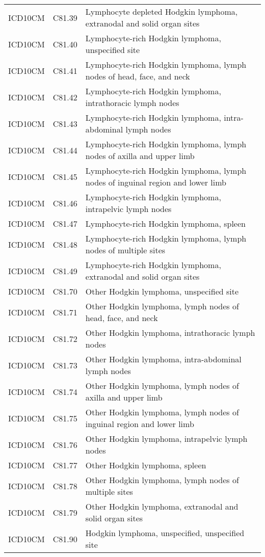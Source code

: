 \begin{longtable}{p{}p{}p{}}
  ICD10CM & C81.39 & Lymphocyte depleted Hodgkin lymphoma, extranodal and solid organ sites \\ 
  ICD10CM & C81.40 & Lymphocyte-rich Hodgkin lymphoma, unspecified site \\ 
  ICD10CM & C81.41 & Lymphocyte-rich Hodgkin lymphoma, lymph nodes of head, face, and neck \\ 
  ICD10CM & C81.42 & Lymphocyte-rich Hodgkin lymphoma, intrathoracic lymph nodes \\ 
  ICD10CM & C81.43 & Lymphocyte-rich Hodgkin lymphoma, intra-abdominal lymph nodes \\ 
  ICD10CM & C81.44 & Lymphocyte-rich Hodgkin lymphoma, lymph nodes of axilla and upper limb \\ 
  ICD10CM & C81.45 & Lymphocyte-rich Hodgkin lymphoma, lymph nodes of inguinal region and lower limb \\ 
  ICD10CM & C81.46 & Lymphocyte-rich Hodgkin lymphoma, intrapelvic lymph nodes \\ 
  ICD10CM & C81.47 & Lymphocyte-rich Hodgkin lymphoma, spleen \\ 
  ICD10CM & C81.48 & Lymphocyte-rich Hodgkin lymphoma, lymph nodes of multiple sites \\ 
  ICD10CM & C81.49 & Lymphocyte-rich Hodgkin lymphoma, extranodal and solid organ sites \\ 
  ICD10CM & C81.70 & Other Hodgkin lymphoma, unspecified site \\ 
  ICD10CM & C81.71 & Other Hodgkin lymphoma, lymph nodes of head, face, and neck \\ 
  ICD10CM & C81.72 & Other Hodgkin lymphoma, intrathoracic lymph nodes \\ 
  ICD10CM & C81.73 & Other Hodgkin lymphoma, intra-abdominal lymph nodes \\ 
  ICD10CM & C81.74 & Other Hodgkin lymphoma, lymph nodes of axilla and upper limb \\ 
  ICD10CM & C81.75 & Other Hodgkin lymphoma, lymph nodes of inguinal region and lower limb \\ 
  ICD10CM & C81.76 & Other Hodgkin lymphoma, intrapelvic lymph nodes \\ 
  ICD10CM & C81.77 & Other Hodgkin lymphoma, spleen \\ 
  ICD10CM & C81.78 & Other Hodgkin lymphoma, lymph nodes of multiple sites \\ 
  ICD10CM & C81.79 & Other Hodgkin lymphoma, extranodal and solid organ sites \\ 
  ICD10CM & C81.90 & Hodgkin lymphoma, unspecified, unspecified site \\ 

\end{longtable}
